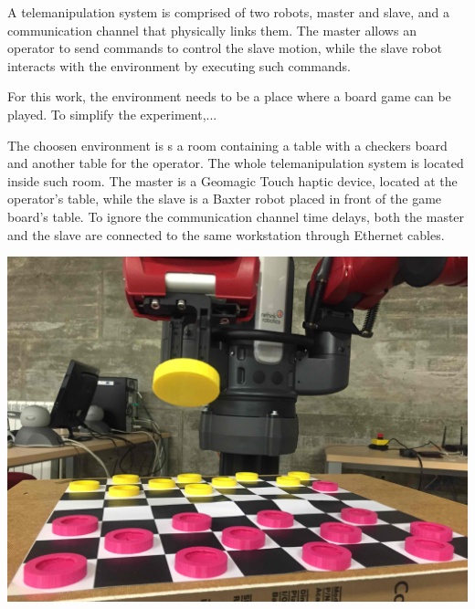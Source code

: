 \documentclass[journal,twoside]{JoPhA}
\begin{document}

  A telemanipulation system is comprised of two robots, master and slave, and a communication channel that physically links them. The master allows an operator to send commands to control the slave motion, while the slave robot interacts with the environment by executing such commands. 
  
  For this work, the environment needs to be a place where a board game can be played. To simplify the experiment,...
  
   The choosen environment is s a room containing a table with a checkers board and another table for the operator. The whole telemanipulation system is located inside such room. The master is a Geomagic Touch haptic device, located at the operator's table, while the slave is a Baxter robot placed in front of the game board's table. To ignore the communication channel time delays, both the master and the slave are connected to the same workstation through Ethernet cables.
  
  
\includegraphics[scale=0.07]{Images/baxterHoldingPiece.jpg} 
\end{document}
